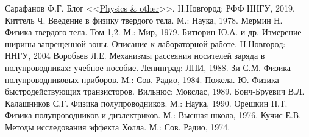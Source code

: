 \begin{thebibliography}{}
	 Сарафанов Ф.Г. Блог <<\href{http://fedorsarafanov.github.io}{Physics \& other}>>. Н.Новгород: РФФ ННГУ, 2019.
	 Киттель Ч. Введение в физику твердого тела. М.: Наука, 1978.
	 Мермин Н. Физика твердого тела. Том 1,2. М.: Мир, 1979.
	 Битюрин Ю.А. и др. Измерение ширины запрещенной зоны. Описание к лабораторной работе. Н.Новгород: ННГУ, 2004
	 Воробьев Л.Е. Механизмы рассеяния носителей заряда в полупроводниках: учебное пособие. Ленинград: ЛПИ, 1988.
	 Зи С.М. Физика полупроводниковых приборов. М.: Сов. Радио, 1984.
	 Пожела. Ю. Физика быстродействующих транзисторов. Вильнюс: Мокслас, 1989.
	 Бонч-Бруевич В.Л. Калашников С.Г. Физика полупроводников. М.: Наука, 1990.
	 Орешкин П.Т. Физика полупроводников и диэлектриков. М.: Высшая школа, 1976.
	 Кучис Е.В. Методы исследования эффекта Холла. М.: Сов. Радио, 1974.
\end{thebibliography}


